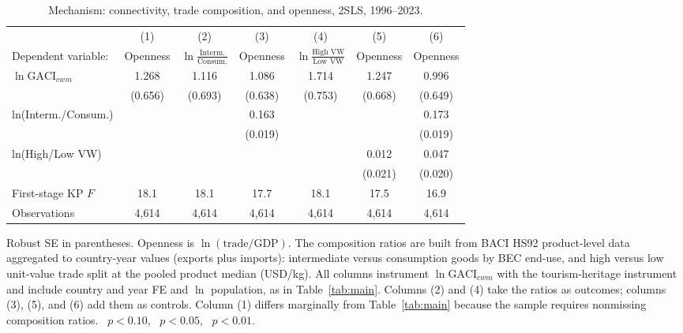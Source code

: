 \begin{table}[H]
\centering
\caption{Mechanism: connectivity, trade composition, and openness, 2SLS,
1996--2023.}
\label{tab:mechanism}
\begin{threeparttable}
\small
\begin{tabular}{lcccccc}
\toprule
 & (1) & (2) & (3) & (4) & (5) & (6) \\
Dependent variable: & Openness & $\ln\frac{\text{Interm.}}{\text{Consum.}}$ & Openness & $\ln\frac{\text{High VW}}{\text{Low VW}}$ & Openness & Openness \\
\midrule
$\ln\mathrm{GACI}_{cwm}$ & 1.268\sym{*} & 1.116 & 1.086\sym{*} & 1.714\sym{**} & 1.247\sym{*} & 0.996 \\
 & (0.656) & (0.693) & (0.638) & (0.753) & (0.668) & (0.649) \\
ln(Interm./Consum.) &  &  & 0.163\sym{***} &  &  & 0.173\sym{***} \\
 &  &  & (0.019) &  &  & (0.019) \\
ln(High/Low VW) &  &  &  &  & 0.012 & 0.047\sym{**} \\
 &  &  &  &  & (0.021) & (0.020) \\
\midrule
First-stage KP $F$ & 18.1 & 18.1 & 17.7 & 18.1 & 17.5 & 16.9 \\
Observations & 4{,}614 & 4{,}614 & 4{,}614 & 4{,}614 & 4{,}614 & 4{,}614 \\
\bottomrule
\end{tabular}
\begin{tablenotes}\small
\item Robust SE in parentheses. Openness is $\ln(\text{trade}/\text{GDP})$.
The composition ratios are built from BACI HS92 product-level data aggregated
to country-year values (exports plus imports): intermediate versus consumption
goods by BEC end-use, and high versus low unit-value trade split at the pooled
product median (USD/kg). All columns instrument $\ln\mathrm{GACI}_{cwm}$ with
the tourism-heritage instrument and include country and year FE and $\ln$
population, as in Table~\ref{tab:main}. Columns (2) and (4) take the ratios as
outcomes; columns (3), (5), and (6) add them as controls. Column (1) differs
marginally from Table~\ref{tab:main} because the sample requires nonmissing
composition ratios.
\sym{*}~$p<0.10$, \sym{**}~$p<0.05$, \sym{***}~$p<0.01$.
\end{tablenotes}
\end{threeparttable}
\end{table}

